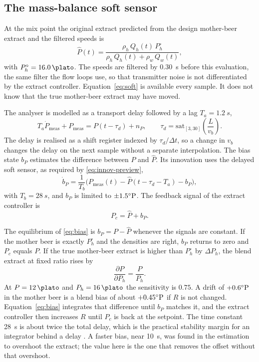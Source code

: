 \subsection{The mass-balance soft sensor}

At the mix point the original extract predicted from the design mother-beer extract and the filtered speeds is
\begin{equation}
\label{eq:soft}
\hat{P}(t) = \frac{\rho_h\, Q_h(t)\, P_h^{\circ}}{\rho_h\, Q_h(t) + \rho_w\, Q_w(t)},
\end{equation}
with $P_h^{\circ}=\SI{16.0}{\plato}$. The speeds are filtered by \SI{0.30}{s} before this evaluation, the same filter the flow loops use, so that transmitter noise is not differentiated by the extract controller. Equation~\eqref{eq:soft} is available every sample. It does not know that the true mother-beer extract may have moved.

The analyser is modelled as a transport delay followed by a lag $T_a=\SI{1.2}{s}$,
\begin{equation}
\label{eq:analyser}
T_a \dot{P}_{\mathrm{meas}} + P_{\mathrm{meas}} = P(t-\tau_d) + n_P, \qquad \tau_d = \mathrm{sat}_{[3,30]}\left(\frac{L}{v_b}\right).
\end{equation}
The delay is realised as a shift register indexed by $\tau_d/\Delta t$, so a change in $v_b$ changes the delay on the next sample without a separate interpolation. The bias state $b_P$ estimates the difference between $P$ and $\hat{P}$. Its innovation uses the delayed soft sensor, as required by \eqref{eq:innov-preview},
\begin{equation}
\label{eq:bias}
\dot{b}_P = \frac{1}{T_b}\Big(P_{\mathrm{meas}}(t) - \hat{P}(t-\tau_d-T_a) - b_P\Big),
\end{equation}
with $T_b=\SI{28}{s}$, and $b_P$ is limited to $\pm 1.5^{\circ}\mathrm{P}$. The feedback signal of the extract controller is
\begin{equation}
\label{eq:pctrl}
P_c = \hat{P} + b_P.
\end{equation}

The equilibrium of \eqref{eq:bias} is $b_P = P - \hat{P}$ whenever the signals are constant. If the mother beer is exactly $P_h^{\circ}$ and the densities are right, $b_P$ returns to zero and $P_c$ equals $P$. If the true mother-beer extract is higher than $P_h^{\circ}$ by $\Delta P_h$, the blend extract at fixed ratio rises by
\begin{equation}
\label{eq:sense-ph}
\frac{\partial P}{\partial P_h} = \frac{P}{P_h}.
\end{equation}
At $P=\SI{12}{\plato}$ and $P_h=\SI{16}{\plato}$ the sensitivity is $0.75$. A drift of $+0.6^{\circ}\mathrm{P}$ in the mother beer is a blend bias of about $+0.45^{\circ}\mathrm{P}$ if $R$ is not changed. Equation~\eqref{eq:bias} integrates that difference until $b_P$ matches it, and the extract controller then increases $R$ until $P_c$ is back at the setpoint. The time constant \SI{28}{s} is about twice the total delay, which is the practical stability margin for an integrator behind a delay \cite{normey2008survey,skogestad2003simc}. A faster bias, near \SI{10}{s}, was found in the estimation to overshoot the extract; the value here is the one that removes the offset without that overshoot.

